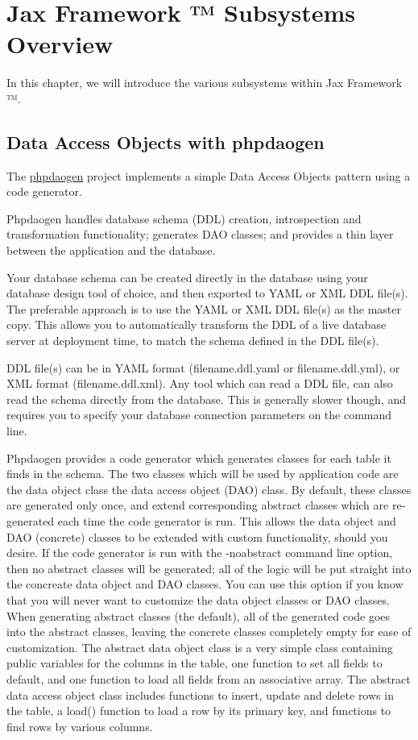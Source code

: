 \documentclass[letterpaper,10pt,english]{sphinxmanual}
\begin{document}
\chapter{Jax Framework ™ Subsystems Overview}
\label{jaxFrameworkGuide:jax-framework-trade-subsystems-overview}
In this chapter, we will introduce the various subsystems within Jax Framework ™.


\section{Data Access Objects with phpdaogen}
\label{jaxFrameworkGuide:data-access-objects-with-phpdaogen}
The \href{http://phpdaogen.sourceforge.net}{phpdaogen} project implements a simple Data Access Objects
pattern using a code generator.

Phpdaogen handles database schema (DDL) creation, introspection and transformation functionality;
generates DAO classes; and provides a thin layer between the application and the database.

Your database schema can be created directly in the database using your database design tool of
choice, and then exported to YAML or XML DDL file(s).  The preferable approach is to use the YAML or
XML DDL file(s) as the master copy.  This allows you to automatically transform the DDL of a live
database server at deployment time, to match the schema defined in the DDL file(s).

DDL file(s) can be in YAML format (filename.ddl.yaml or filename.ddl.yml), or XML format
(filename.ddl.xml).  Any tool which can read a DDL file, can also read the schema directly from the
database.  This is generally slower though, and requires you to specify your database connection
parameters on the command line.

Phpdaogen provides a code generator which generates classes for each table it finds in the schema.
The two classes which will be used by application code are the data object class the data access
object (DAO) class.  By default, these classes are generated only once, and extend corresponding
abstract classes which are re-generated each time the code generator is run.  This allows the data
object and DAO (concrete) classes to be extended with custom functionality, should you desire.  If
the code generator is run with the -noabstract command line option, then no abstract classes will be
generated; all of the logic will be put straight into the concreate data object and DAO classes.
You can use this option if you know that you will never want to customize the data object classes or
DAO classes.  When generating abstract classes (the default), all of the generated code goes into
the abstract classes, leaving the concrete classes completely empty for ease of customization.  The
abstract data object class is a very simple class containing public variables for the columns in the
table, one function to set all fields to default, and one function to load all fields from an
associative array.  The abstract data access object class includes functions to insert, update and
delete rows in the table, a load() function to load a row by its primary key, and functions to find
rows by various columns.
\end{document}
